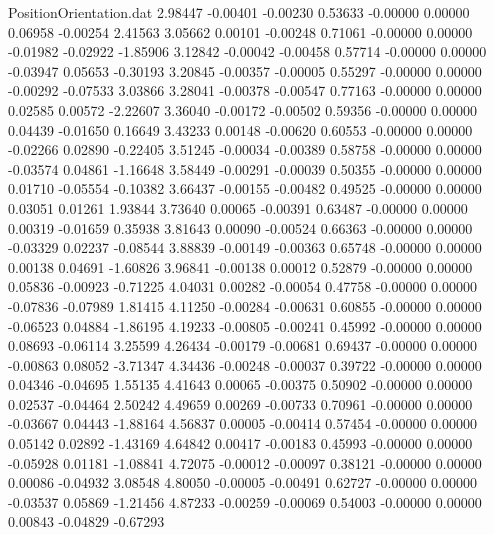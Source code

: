 \begin{filecontents}{PositionOrientation.dat}
   2.98447   -0.00401   -0.00230     0.53633   -0.00000    0.00000    0.06958   -0.00254    2.41563
   3.05662    0.00101   -0.00248     0.71061   -0.00000    0.00000   -0.01982   -0.02922   -1.85906
   3.12842   -0.00042   -0.00458     0.57714   -0.00000    0.00000   -0.03947    0.05653   -0.30193
   3.20845   -0.00357   -0.00005     0.55297   -0.00000    0.00000   -0.00292   -0.07533    3.03866
   3.28041   -0.00378   -0.00547     0.77163   -0.00000    0.00000    0.02585    0.00572   -2.22607
   3.36040   -0.00172   -0.00502     0.59356   -0.00000    0.00000    0.04439   -0.01650    0.16649
   3.43233    0.00148   -0.00620     0.60553   -0.00000    0.00000   -0.02266    0.02890   -0.22405
   3.51245   -0.00034   -0.00389     0.58758   -0.00000    0.00000   -0.03574    0.04861   -1.16648
   3.58449   -0.00291   -0.00039     0.50355   -0.00000    0.00000    0.01710   -0.05554   -0.10382
   3.66437   -0.00155   -0.00482     0.49525   -0.00000    0.00000    0.03051    0.01261    1.93844
   3.73640    0.00065   -0.00391     0.63487   -0.00000    0.00000    0.00319   -0.01659    0.35938
   3.81643    0.00090   -0.00524     0.66363   -0.00000    0.00000   -0.03329    0.02237   -0.08544
   3.88839   -0.00149   -0.00363     0.65748   -0.00000    0.00000    0.00138    0.04691   -1.60826
   3.96841   -0.00138    0.00012     0.52879   -0.00000    0.00000    0.05836   -0.00923   -0.71225
   4.04031    0.00282   -0.00054     0.47758   -0.00000    0.00000   -0.07836   -0.07989    1.81415
   4.11250   -0.00284   -0.00631     0.60855   -0.00000    0.00000   -0.06523    0.04884   -1.86195
   4.19233   -0.00805   -0.00241     0.45992   -0.00000    0.00000    0.08693   -0.06114    3.25599
   4.26434   -0.00179   -0.00681     0.69437   -0.00000    0.00000   -0.00863    0.08052   -3.71347
   4.34436   -0.00248   -0.00037     0.39722   -0.00000    0.00000    0.04346   -0.04695    1.55135
   4.41643    0.00065   -0.00375     0.50902   -0.00000    0.00000    0.02537   -0.04464    2.50242
   4.49659    0.00269   -0.00733     0.70961   -0.00000    0.00000   -0.03667    0.04443   -1.88164
   4.56837    0.00005   -0.00414     0.57454   -0.00000    0.00000    0.05142    0.02892   -1.43169
   4.64842    0.00417   -0.00183     0.45993   -0.00000    0.00000   -0.05928    0.01181   -1.08841
   4.72075   -0.00012   -0.00097     0.38121   -0.00000    0.00000    0.00086   -0.04932    3.08548
   4.80050   -0.00005   -0.00491     0.62727   -0.00000    0.00000   -0.03537    0.05869   -1.21456
   4.87233   -0.00259   -0.00069     0.54003   -0.00000    0.00000    0.00843   -0.04829   -0.67293

\end{filecontents}
